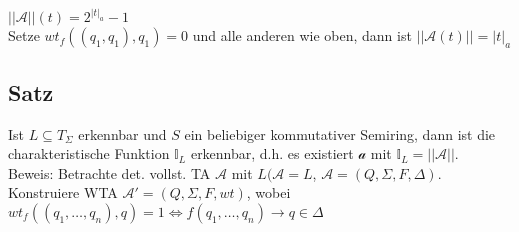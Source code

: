\documentclass[titlepage]{article}
\begin{document}
$||\mathcal{A}||(t) = 2^{|t|_a} - 1$\\

Setze $wt_f((q_1,q_1),q_1) = 0$ und alle anderen wie oben,
dann ist $||\mathcal{A}(t)|| = |t|_a$

\subsection{Satz}

Ist $L \subseteq T_\Sigma$ erkennbar und $S$ ein beliebiger kommutativer Semiring,
dann ist die charakteristische Funktion $\mathbb{I}_L$ erkennbar, d.h. es existiert $\mathcal{a}$ mit
$\mathbb{I}_L = ||\mathcal{A}||$.\\

Beweis: Betrachte det. vollst. TA $\mathcal{A}$ mit $L(\mathcal{A} = L$,
$\mathcal{A} = (Q,\Sigma,F,\Delta)$. Konstruiere WTA $\mathcal{A}' = (Q,\Sigma,F,wt)$,
wobei $wt_f((q_1, \dots, q_n),q) = 1 \Leftrightarrow f(q_1, \dots, q_n) \to q \in \Delta$
\end{document}
